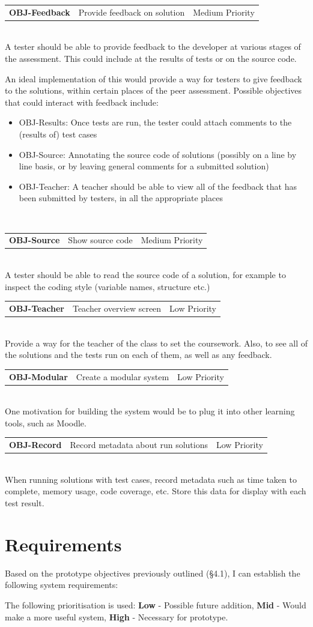 \documentclass[a4paper,11pt]{report}
\newcommand{\objitem}[4]{\begin{tabularx}{\textwidth}{lXr} \textbf{OBJ-#1} & #2 & #3\end{tabularx}\\#4\\}
\begin{document}
\objitem{Feedback}{Provide feedback on solution}{Medium Priority}{A tester should be able to provide feedback to the developer at various stages of the assessment. This could include at the results of tests or on the source code.\par
An ideal implementation of this would provide a way for testers to give feedback to the solutions, within certain places of the peer assessment. Possible objectives that could interact with feedback include:
\begin{itemize}
 \item OBJ-Results: Once tests are run, the tester could attach comments to the (results of) test cases
 \item OBJ-Source: Annotating the source code of solutions (possibly on a line by line basis, or by leaving general comments for a submitted solution)
 \item OBJ-Teacher: A teacher should be able to view all of the feedback that has been submitted by testers, in all the appropriate places
\end{itemize}~}
\objitem{Source}{Show source code}{Medium Priority}{A tester should be able to read the source code of a solution, for example to inspect the coding style (variable names, structure etc.)}
\objitem{Teacher}{Teacher overview screen}{Low Priority}{Provide a way for the teacher of the class to set the coursework. Also, to see all of the solutions and the tests run on each of them, as well as any feedback.}
\objitem{Modular}{Create a modular system}{Low Priority}{One motivation for building the system would be to plug it into other learning tools, such as Moodle.}
\objitem{Record}{Record metadata about run solutions}{Low Priority}{When running solutions with test cases, record metadata such as time taken to complete, memory usage, code coverage, etc. Store this data for display with each test result.}

\section{Requirements}
Based on the  prototype objectives previously outlined (\S4.1), I can establish the following system requirements:\par
The following prioritisation is used: \textbf{Low} - Possible future addition, \textbf{Mid} - Would make a more useful system, \textbf{High} - Necessary for prototype.
\end{document}
